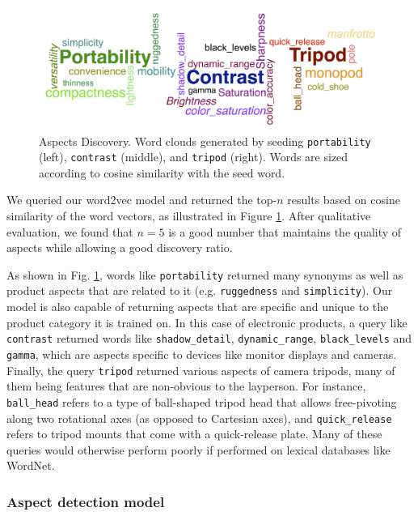 \documentclass{article} %
\begin{document}
\begin{figure}[ht]
\begin{center}
\includegraphics[width=\columnwidth]{Aspects_long.png}
\end{center}
\caption{Aspects Discovery. Word clouds generated by seeding \texttt{portability} (left), \texttt{contrast} (middle), and \texttt{tripod} (right). Words are sized according to cosine similarity with the seed word.}
\label{aspectFig}
\end{figure}

We queried our word2vec model and returned the top-$n$ results based on cosine similarity of the word vectors, as illustrated in Figure \ref{aspectFig}. After qualitative evaluation, we found that $n=5$ is a good number that maintains the quality of aspects while allowing a good discovery ratio.

As shown in Fig. \ref{aspectFig}, words like \texttt{portability} returned many synonyms as well as product aspects that are related to it (e.g. \texttt{ruggedness} and \texttt{simplicity}). Our model is also capable of returning aspects that are specific and unique to the product category it is trained on. In this case of electronic products, a query like \texttt{contrast} returned words like \texttt{shadow\_detail}, \texttt{dynamic\_range}, \texttt{black\_levels} and \texttt{gamma}, which are aspects specific to devices like monitor displays and cameras. Finally, the query \texttt{tripod} returned various aspects of camera tripods, many of them being features that are non-obvious to the layperson. For instance, \texttt{ball\_head} refers to a type of ball-shaped tripod head that allows free-pivoting along two rotational axes (as opposed to Cartesian axes), and \texttt{quick\_release} refers to tripod mounts that come with a quick-release plate. Many of these queries would otherwise perform poorly if performed on lexical databases like WordNet.


\subsubsection{ Aspect detection model }
\end{document}
